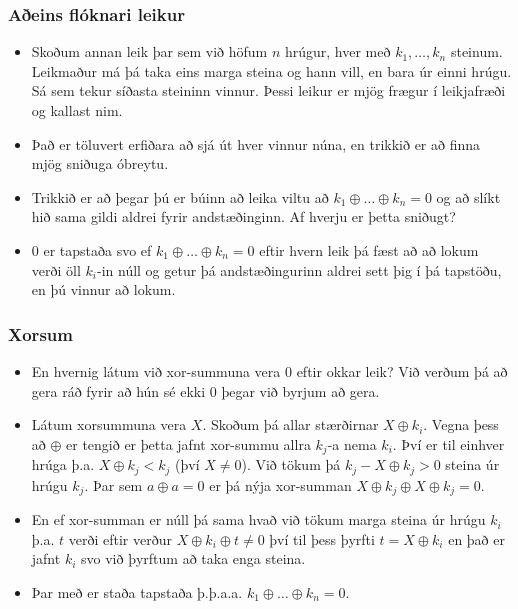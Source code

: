 \documentclass{beamer}
\begin{document}
\begin{frame}
\frametitle{Aðeins flóknari leikur}

\begin{itemize}

\item<1-> Skoðum annan leik þar sem við höfum $n$ hrúgur, hver með $k_1, \dots, k_n$ steinum. Leikmaður má þá taka eins marga steina og hann vill, en bara úr einni hrúgu. Sá sem tekur síðasta steininn vinnur. Þessi leikur er mjög frægur í leikjafræði og kallast nim.

\item<2-> Það er töluvert erfiðara að sjá út hver vinnur núna, en trikkið er að finna mjög sniðuga óbreytu.

\item<3-> Trikkið er að þegar þú er búinn að leika viltu að $k_1 \oplus \dots \oplus k_n = 0$ og að slíkt hið sama gildi aldrei fyrir andstæðinginn. Af hverju er þetta sniðugt?

\item<4-> $0$ er tapstaða svo ef $k_1 \oplus \dots \oplus k_n = 0$ eftir hvern leik þá fæst að að lokum verði öll $k_i$-in núll og getur þá andstæðingurinn aldrei sett þig í þá tapstöðu, en þú vinnur að lokum.

\end{itemize}

\end{frame}

\begin{frame}
\frametitle{Xorsum}

\begin{itemize}

\item<1-> En hvernig látum við xor-summuna vera $0$ eftir okkar leik? Við verðum þá að gera ráð fyrir að hún sé ekki $0$ þegar við byrjum að gera. 

\item<2-> Látum xorsummuna vera $X$. Skoðum þá allar stærðirnar $X \oplus k_i$. Vegna þess að $\oplus$ er tengið er þetta jafnt xor-summu allra $k_j$-a nema $k_i$. Því er til einhver hrúga þ.a. $X \oplus k_j < k_j$ (því $X \neq 0$). Við tökum þá $k_j - X \oplus k_j > 0$ steina úr hrúgu $k_j$. Þar sem $a \oplus a = 0$ er þá nýja xor-summan $X \oplus k_j \oplus X \oplus k_j = 0$.

\item<3-> En ef xor-summan er núll þá sama hvað við tökum marga steina úr hrúgu $k_i$ þ.a. $t$ verði eftir verður $X \oplus k_i \oplus t \neq 0$ því til þess þyrfti $t = X \oplus k_i$ en það er jafnt $k_i$ svo við þyrftum að taka enga steina.

\item<4-> Þar með er staða tapstaða þ.þ.a.a. $k_1 \oplus \dots \oplus k_n = 0$.

\end{itemize}

\end{frame}
\end{document}
